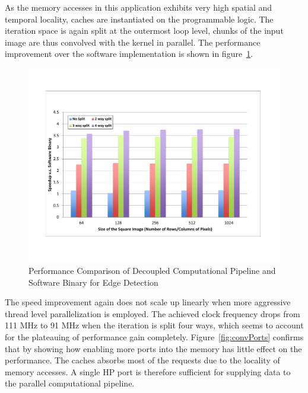 As the memory accesses in this application exhibits very high spatial and temporal locality, caches are instantiated on the programmable logic. The iteration space is again split at the outermost loop level, chunks of the input image are thus convolved with the kernel in parallel. The performance improvement over the software implementation is shown in figure~\ref{fig:convperf}.



\begin{figure}[htp]
\begin{center}
\includegraphics[width=1.0\linewidth]{chap6fig/convperf.pdf}
\caption{Performance Comparison of Decoupled Computational Pipeline and Software Binary for Edge Detection
\label{fig:convperf}}
\end{center}
\end{figure}

The speed improvement again does not scale up linearly when more
aggressive thread level parallelization is employed. The achieved clock frequency drops from 111 MHz to 91 MHz when the iteration is split four ways, which seems to account for the plateauing of performance gain completely. Figure~\ref{fig:convPorts} confirms that by showing  how enabling more ports into the memory has little effect on the performance. The caches absorbs most of the requests due to the locality of memory accesses. A single HP port is therefore sufficient for supplying data to the parallel computational pipeline.

